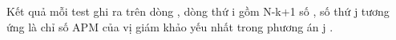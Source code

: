 Kết quả mỗi test ghi ra trên dòng , dòng thứ i gồm N-k+1 số , số thứ j tương ứng là chỉ số APM của vị giám khảo yếu nhất trong phương án j .